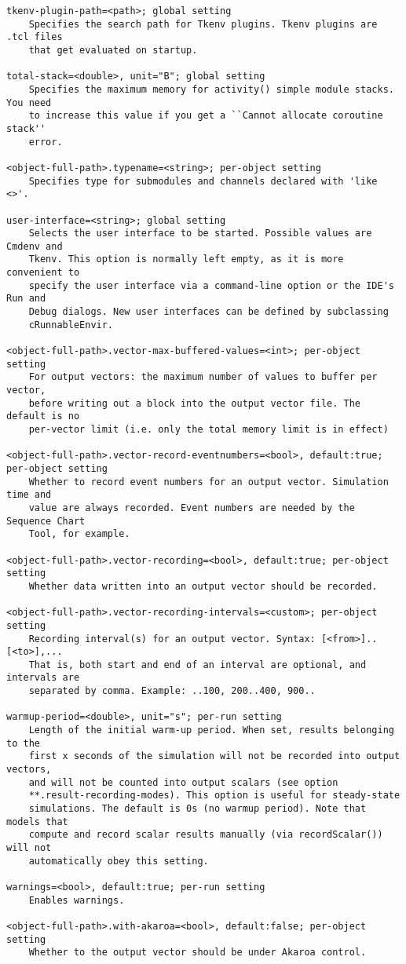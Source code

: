 \begin{verbatim}
tkenv-plugin-path=<path>; global setting
    Specifies the search path for Tkenv plugins. Tkenv plugins are .tcl files
    that get evaluated on startup.

total-stack=<double>, unit="B"; global setting
    Specifies the maximum memory for activity() simple module stacks. You need
    to increase this value if you get a ``Cannot allocate coroutine stack''
    error.

<object-full-path>.typename=<string>; per-object setting
    Specifies type for submodules and channels declared with 'like <>'.

user-interface=<string>; global setting
    Selects the user interface to be started. Possible values are Cmdenv and
    Tkenv. This option is normally left empty, as it is more convenient to
    specify the user interface via a command-line option or the IDE's Run and
    Debug dialogs. New user interfaces can be defined by subclassing
    cRunnableEnvir.

<object-full-path>.vector-max-buffered-values=<int>; per-object setting
    For output vectors: the maximum number of values to buffer per vector,
    before writing out a block into the output vector file. The default is no
    per-vector limit (i.e. only the total memory limit is in effect)

<object-full-path>.vector-record-eventnumbers=<bool>, default:true; per-object setting
    Whether to record event numbers for an output vector. Simulation time and
    value are always recorded. Event numbers are needed by the Sequence Chart
    Tool, for example.

<object-full-path>.vector-recording=<bool>, default:true; per-object setting
    Whether data written into an output vector should be recorded.

<object-full-path>.vector-recording-intervals=<custom>; per-object setting
    Recording interval(s) for an output vector. Syntax: [<from>]..[<to>],...
    That is, both start and end of an interval are optional, and intervals are
    separated by comma. Example: ..100, 200..400, 900..

warmup-period=<double>, unit="s"; per-run setting
    Length of the initial warm-up period. When set, results belonging to the
    first x seconds of the simulation will not be recorded into output vectors,
    and will not be counted into output scalars (see option
    **.result-recording-modes). This option is useful for steady-state
    simulations. The default is 0s (no warmup period). Note that models that
    compute and record scalar results manually (via recordScalar()) will not
    automatically obey this setting.

warnings=<bool>, default:true; per-run setting
    Enables warnings.

<object-full-path>.with-akaroa=<bool>, default:false; per-object setting
    Whether to the output vector should be under Akaroa control.
\end{verbatim}


